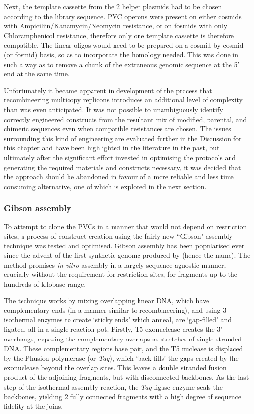 Next, the template cassette from the 2 helper plasmids had to be chosen according to the library sequence. PVC operons were present on either cosmids with Ampiciliin/Kanamycin/Neomycin resistance, or on fosmids with only Chloramphenicol resistance, therefore only one template cassette is therefore compatible. The linear oligos would need to be prepared on a cosmid-by-cosmid (or fosmid) basis, so as to incorporate the homology needed. This was done in such a way as to remove a chunk of the extraneous genomic sequence at the 5' end at the same time.

Unfortunately it became apparent in development of the process that recombineering multicopy replicons introduces an additional level of complexity than was even anticipated. It was not possible to unambiguously identify correctly engineered constructs from the resultant mix of modified, parental, and chimeric sequences even when compatible resistances are chosen. The issues surrounding this kind of engineering are evaluated further in the Discussion for this chapter and have been highlighted in the literature in the past, but ultimately after the significant effort invested in optimising the protocols and generating the required materials and constructs necessary, it was decided that the approach should be abandoned in favour of a more reliable and less time consuming alternative, one of which is explored in the next section.


\clearpage
\subsubsection{Gibson assembly}
To attempt to clone the PVCs in a manner that would not depend on restriction sites, a process of construct creation using the fairly new ``Gibson" assembly technique was tested and optimised. Gibson assembly has been popularised ever since the advent of the first synthetic genome produced by \cite{Gibson2010c, Gibson2009a} (hence the name). The method promises \emph{in vitro} assembly in a largely sequence-agnostic manner, crucially without the requirement for restriction sites, for fragments up to the hundreds of kilobase range.

The technique works by mixing overlapping linear DNA, which have complementary ends (in a manner similar to recombineering), and using 3 isothermal enzymes to create `sticky ends' which anneal, are `gap-filled' and ligated, all in a single reaction pot. Firstly, T5 exonuclease creates the 3' overhangs, exposing the complementary overlaps as stretches of single stranded DNA. These complementary regions base pair, and the T5 nuclease is displaced by the Phusion polymerase (or \emph{Taq}), which `back fills' the gaps created by the exonuclease beyond the overlap sites. This leaves a double stranded fusion product of the adjoining fragments, but with disconnected backbones. As the last step of the isothermal assembly reaction, the \emph{Taq} ligase enzyme seals the backbones, yielding 2 fully connected fragments with a high degree of sequence fidelity at the joins.

